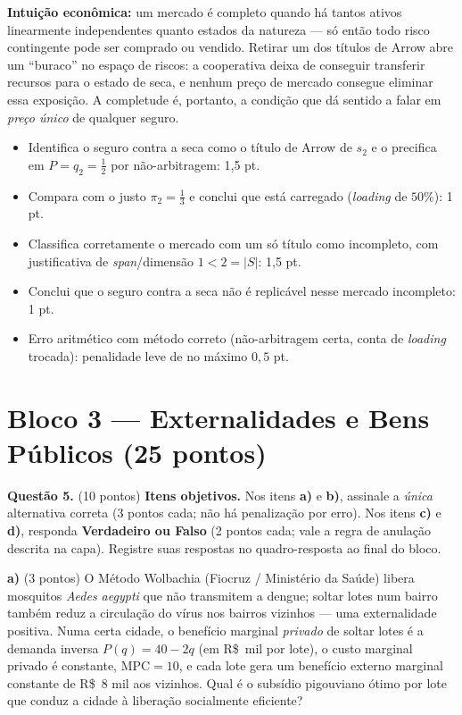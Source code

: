 \begin{solucao}
\textbf{Intuição econômica:} um mercado é completo quando há tantos ativos linearmente independentes quanto estados da natureza --- só então todo risco contingente pode ser comprado ou vendido. Retirar um dos títulos de Arrow abre um ``buraco'' no espaço de riscos: a cooperativa deixa de conseguir transferir recursos para o estado de seca, e nenhum preço de mercado consegue eliminar essa exposição. A completude é, portanto, a condição que dá sentido a falar em \emph{preço único} de qualquer seguro.
\rubricalabel
\begin{itemize}
\item Identifica o seguro contra a seca como o título de Arrow de $s_2$ e o precifica em $P=q_2=\tfrac12$ por não-arbitragem: 1{,}5 pt.
\item Compara com o justo $\pi_2=\tfrac13$ e conclui que está carregado (\emph{loading} de $50\%$): 1 pt.
\item Classifica corretamente o mercado com um só título como incompleto, com justificativa de \emph{span}/dimensão $1<2=|S|$: 1{,}5 pt.
\item Conclui que o seguro contra a seca não é replicável nesse mercado incompleto: 1 pt.
\item Erro aritmético com método correto (não-arbitragem certa, conta de \emph{loading} trocada): penalidade leve de no máximo $0{,}5$ pt.
\end{itemize}
\end{solucao}



\section*{Bloco 3 --- Externalidades e Bens Públicos \hfill \normalsize (25 pontos)}

\textbf{Questão 5.} (10 pontos) \textbf{Itens objetivos.} Nos itens \textbf{a)} e \textbf{b)}, assinale a \emph{única} alternativa correta (3 pontos cada; não há penalização por erro). Nos itens \textbf{c)} e \textbf{d)}, responda \textbf{Verdadeiro ou Falso} (2 pontos cada; vale a regra de anulação descrita na capa). Registre suas respostas no quadro-resposta ao final do bloco.

\textbf{a)} (3 pontos) O M\'etodo Wolbachia (Fiocruz / Minist\'erio da Sa\'ude) libera mosquitos \emph{Aedes aegypti} que n\~ao transmitem a dengue; soltar lotes num bairro tamb\'em reduz a circula\c{c}\~ao do v\'irus nos bairros vizinhos --- uma externalidade positiva. Numa certa cidade, o benef\'icio marginal \emph{privado} de soltar lotes \'e a demanda inversa $P(q)=40-2q$ (em R\$~mil por lote), o custo marginal privado \'e constante, $\text{MPC}=10$, e cada lote gera um benef\'icio externo marginal constante de R\$~8 mil aos vizinhos. Qual \'e o subs\'idio pigouviano \'otimo por lote que conduz a cidade \`a libera\c{c}\~ao socialmente eficiente?

